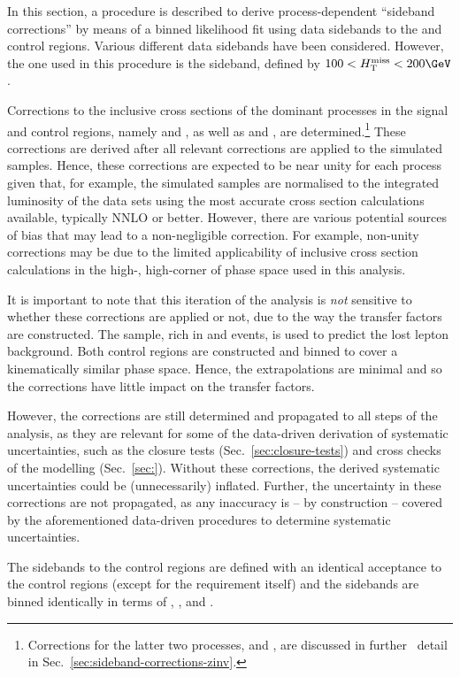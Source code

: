 In this section, a procedure is described to derive process-dependent
``sideband corrections'' by means of a binned likelihood fit using
data sidebands to the \mj and \mmj control regions. Various different
data sidebands have been considered. However, the one used in this
procedure is the \HTmiss sideband, defined by $100 < \HTmiss <
200\GeV$.

Corrections to the inclusive cross sections of the dominant processes
in the signal and control regions, namely \wj and \ttbar, as well as
\zmmj and \znunuj, are determined.\footnote{Corrections for the latter
  two processes, \zmmj and \znunuj, are discussed in further \ detail
  in Sec.~\ref{sec:sideband-corrections-zinv}.} These corrections are
derived after all relevant corrections are applied to the simulated
samples. Hence, these corrections are expected to be near unity for
each process given that, for example, the simulated samples are
normalised to the integrated luminosity of the data sets using the
most accurate cross section calculations available, typically NNLO or
better. However, there are various potential sources of bias that may
lead to a non-negligible correction. For example, non-unity
corrections may be due to the limited applicability of inclusive cross
section calculations in the high-\scalht, high-\ETmiss corner of phase
space used in this analysis.

It is important to note that this iteration of the analysis is {\em
  not} sensitive to whether these corrections are applied or not, due
to the way the transfer factors are constructed. The \mj sample, rich
in \wj and \ttbar events, is used to predict the lost lepton
background. Both control regions are constructed and binned to cover a
kinematically similar phase space. Hence, the extrapolations are
minimal and so the corrections have little impact on the transfer
factors.

However, the corrections are still determined and propagated to all
steps of the analysis, as they are relevant for some of the
data-driven derivation of systematic uncertainties, such as the
closure tests (Sec.~\ref{sec:closure-tests}) and cross checks of the
\HTmiss modelling (Sec.~\ref{sec:}). Without these corrections, the
derived systematic uncertainties could be (unnecessarily)
inflated. Further, the uncertainty in these corrections are not
propagated, as any inaccuracy is -- by construction -- covered by the
aforementioned data-driven procedures to determine systematic
uncertainties.

The \HTmiss sidebands to the control regions are defined with an
identical acceptance to the control regions (except for the \HTmiss
requirement itself) and the sidebands are binned identically in terms
of \njet, \scalht, and \nb. 

